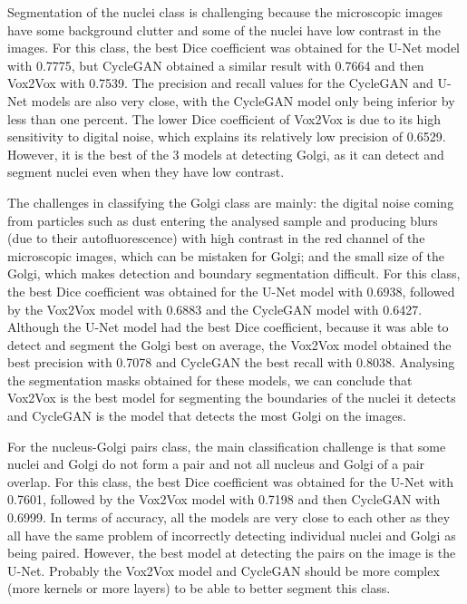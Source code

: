 Segmentation of the nuclei class is challenging because the microscopic images have some background clutter and some of the nuclei have low contrast in the images. For this class, the best Dice coefficient was obtained for the U-Net model with 0.7775, but CycleGAN obtained a similar result with 0.7664 and then Vox2Vox with 0.7539. The precision and recall values for the CycleGAN and U-Net models are also very close, with the CycleGAN model only being inferior by less than one percent. The lower Dice coefficient of Vox2Vox is due to its high sensitivity to digital noise, which explains its relatively low precision of 0.6529. However, it is the best of the 3 models at detecting Golgi, as it can detect and segment nuclei even when they have low contrast.

The challenges in classifying the Golgi class are mainly: the digital noise coming from particles such as dust entering the analysed sample and producing blurs (due to their autofluorescence) with high contrast in the red channel of the microscopic images, which can be mistaken for Golgi; and the small size of the Golgi, which makes detection and boundary segmentation difficult. For this class, the best Dice coefficient was obtained for the U-Net model with 0.6938, followed by the Vox2Vox model with 0.6883 and the CycleGAN model with 0.6427. Although the U-Net model had the best Dice coefficient, because it was able to detect and segment the Golgi best on average, the Vox2Vox model obtained the best precision with 0.7078 and CycleGAN the best recall with 0.8038. Analysing the segmentation masks obtained for these models, we can conclude that Vox2Vox is the best model for segmenting the boundaries of the nuclei it detects and CycleGAN is the model that detects the most Golgi on the images.

For the nucleus-Golgi pairs class, the main classification challenge is that some nuclei and Golgi do not form a pair and not all nucleus and Golgi of a pair overlap. For this class, the best Dice coefficient was obtained for the U-Net with 0.7601, followed by the Vox2Vox model with 0.7198 and then CycleGAN with 0.6999. In terms of accuracy, all the models are very close to each other as they all have the same problem of incorrectly detecting individual nuclei and Golgi as being paired. However, the best model at detecting the pairs on the image is the U-Net. Probably the Vox2Vox model and CycleGAN should be more complex (more kernels or more layers) to be able to better segment this class.

